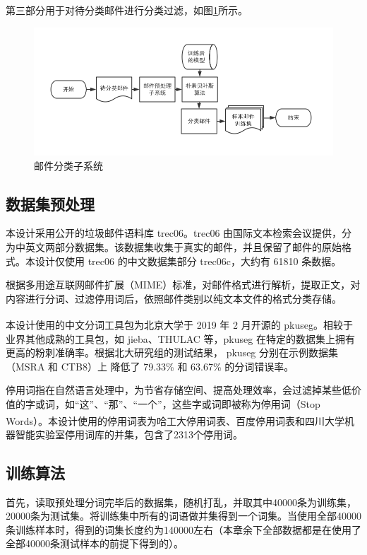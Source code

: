 \documentclass[UTF8,zihao=-4]{ctexart}
\newcommand{\upcite}[1]{\textsuperscript{\cite{#1}}}
\begin{document}
	第三部分用于对待分类邮件进行分类过滤，如图\ref{fig:predict-system}所示。
	\begin{figure}[H]
		\centering
		
		\setlength{\abovecaptionskip}{0.cm}
		\setlength{\belowcaptionskip}{-0.cm}	
		\includegraphics[scale=0.45]{pictures/邮件分类子系统.png}
		\caption{邮件分类子系统}
		\label{fig:predict-system}
	\end{figure}


\subsection{数据集预处理}
	本设计采用公开的垃圾邮件语料库  trec06。trec06 由国际文本检索会议提供，分为中英文两部分数据集。该数据集收集于真实的邮件，并且保留了邮件的原始格式。本设计仅使用 trec06 的中文数据集部分 trec06c，大约有 61810 条数据。

	根据多用途互联网邮件扩展（MIME）标准，对邮件格式进行解析，提取正文，对内容进行分词、过滤停用词后，依照邮件类别以纯文本文件的格式分类存储。
		
	本设计使用的中文分词工具包为北京大学于 2019 年 2 月开源的 pkuseg\upcite{pkuseg}。相较于业界其他成熟的工具包，如 jieba、THULAC 等，pkuseg 在特定的数据集上拥有更高的粉刺准确率。根据北大研究组的测试结果， pkuseg 分别在示例数据集（MSRA 和 CTB8）上
降低了 79.33\% 和 63.67\% 的分词错误率。
	
	停用词指在自然语言处理中，为节省存储空间、提高处理效率，会过滤掉某些低价值的字或词，如“这”、“那”、“一个”，这些字或词即被称为停用词（Stop Words）\upcite{stopwords}。本设计使用的停用词表为哈工大停用词表、百度停用词表和四川大学机器智能实验室停用词库的并集，包含了2313个停用词。
\subsection{训练算法}
	首先，读取预处理分词完毕后的数据集，随机打乱，并取其中40000条为训练集，20000条为测试集。将训练集中所有的词语做并集得到一个词集。当使用全部40000条训练样本时，得到的词集长度约为140000左右（本章余下全部数据都是在使用了全部40000条测试样本的前提下得到的）。
	
\end{document}
